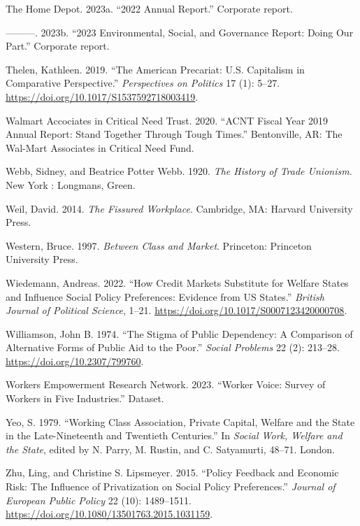 \documentclass[
  11pt,
  oneside]{article}
\newlength{\cslhangindent}
\newenvironment{CSLReferences}[2] %
 {\begin{list}{}{%
  \setlength{\itemindent}{0pt}
  \setlength{\leftmargin}{0pt}
  \setlength{\parsep}{0pt}
  \ifodd #1
   \setlength{\leftmargin}{\cslhangindent}
   \setlength{\itemindent}{-1\cslhangindent}
  \fi
  \setlength{\itemsep}{#2\baselineskip}}}
 {\end{list}}
\begin{document}
\begin{CSLReferences}{1}{0}
The Home Depot. 2023a. {``2022 Annual Report.''} Corporate report.

---------. 2023b. {``2023 Environmental, Social, and Governance Report: Doing Our Part.''} Corporate report.

Thelen, Kathleen. 2019. {``The {American} {Precariat}: {U}.{S}. {Capitalism} in {Comparative} {Perspective}.''} \emph{Perspectives on Politics} 17 (1): 5--27. \url{https://doi.org/10.1017/S1537592718003419}.

Walmart Accociates in Critical Need Trust. 2020. {``{ACNT Fiscal Year} 2019 {Annual Report}: {Stand} Together Through Tough Times.''} Bentonville, AR: The Wal-Mart Associates in Critical Need Fund.

Webb, Sidney, and Beatrice Potter Webb. 1920. \emph{The History of Trade Unionism}. New York : Longmans, Green.

Weil, David. 2014. \emph{The {Fissured} {Workplace}}. Cambridge, MA: Harvard University Press.

Western, Bruce. 1997. \emph{Between Class and Market}. Princeton: Princeton University Press.

Wiedemann, Andreas. 2022. {``How {Credit} {Markets} {Substitute} for {Welfare} {States} and {Influence} {Social} {Policy} {Preferences}: {Evidence} from {US} {States}.''} \emph{British Journal of Political Science}, 1--21. \url{https://doi.org/10.1017/S0007123420000708}.

Williamson, John B. 1974. {``The {Stigma} of {Public} {Dependency}: {A} {Comparison} of {Alternative} {Forms} of {Public} {Aid} to the {Poor}.''} \emph{Social Problems} 22 (2): 213--28. \url{https://doi.org/10.2307/799760}.

Workers Empowerment Research Network. 2023. {``Worker Voice: Survey of Workers in Five Industries.''} Dataset.

Yeo, S. 1979. {``Working Class Association, Private Capital, Welfare and the State in the Late-Nineteenth and Twentieth Centuries.''} In \emph{Social Work, Welfare and the State}, edited by N. Parry, M. Rustin, and C. Satyamurti, 48--71. London.

Zhu, Ling, and Christine S. Lipsmeyer. 2015. {``Policy Feedback and Economic Risk: The Influence of Privatization on Social Policy Preferences.''} \emph{Journal of European Public Policy} 22 (10): 1489--1511. \url{https://doi.org/10.1080/13501763.2015.1031159}.

\end{CSLReferences}
\end{document}
